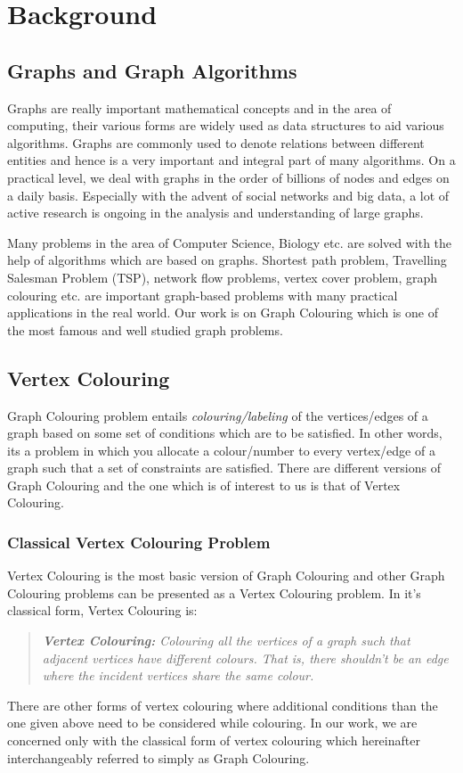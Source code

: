 \documentclass[MTech]{iitmdiss}
\begin{document}
\chapter{Background}
\section{Graphs and Graph Algorithms}
Graphs are really important mathematical concepts and in the area of computing, their various forms are widely used as data structures to aid various algorithms. Graphs are commonly used to denote relations between different entities and hence is a very important and integral part of many algorithms. On a practical level, we deal with graphs in the order of billions of nodes and edges on a daily basis. Especially with the advent of social networks and big data, a lot of active research is ongoing in the analysis and understanding of large graphs.

Many problems in the area of Computer Science, Biology etc. are solved with the help of algorithms which are based on graphs. Shortest path problem, Travelling Salesman Problem (TSP), network flow problems, vertex cover problem, graph colouring etc. are important graph-based problems with many practical applications in the real world. Our work is on Graph Colouring which is one of the most famous and well studied graph problems.
\section{Vertex Colouring}
Graph Colouring problem entails \textit{colouring/labeling} of the vertices/edges of a graph based on some set of conditions which are to be satisfied. In other words, its a problem in which you allocate a colour/number to every vertex/edge of a graph such that a set of constraints are satisfied. There are different versions of Graph Colouring and the one which is of interest to us is that of Vertex Colouring.
\subsection{Classical Vertex Colouring Problem}
Vertex Colouring is the most basic version of Graph Colouring and other Graph Colouring problems can be presented as a Vertex Colouring problem. In it's classical form, Vertex Colouring is:
\begin{verse}
\textit{\textbf{Vertex Colouring:} Colouring all the vertices of a graph such that adjacent vertices have different colours. That is, there shouldn't be an edge where the incident vertices share the same colour.}
\end{verse}
There are other forms of vertex colouring where additional conditions than the one given above need to be considered while colouring. In our work, we are concerned only with the classical form of vertex colouring which hereinafter interchangeably referred to simply as Graph Colouring.
\end{document}
